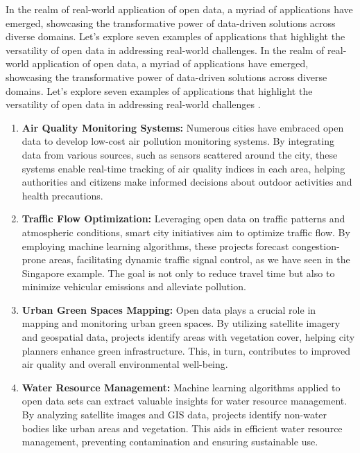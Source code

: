 In the realm of real-world application of open data, a myriad of applications have emerged, showcasing the transformative power of data-driven solutions across diverse domains. Let's explore seven examples of applications that highlight the versatility of open data in addressing real-world challenges.
In the realm of real-world application of open data, a myriad of applications have emerged, showcasing the transformative power of data-driven solutions across diverse domains. Let's explore seven examples of applications that highlight the versatility of open data in addressing real-world challenges \cite{electronics10232997}.
\begin{enumerate}
\item \textbf{Air Quality Monitoring Systems:}
   Numerous cities have embraced open data to develop low-cost air pollution monitoring systems. By integrating data from various sources, such as sensors scattered around the city, these systems enable real-time tracking of air quality indices in each area, helping authorities and citizens make informed decisions about outdoor activities and health precautions.

\item \textbf{Traffic Flow Optimization:}
   Leveraging open data on traffic patterns and atmospheric conditions, smart city initiatives aim to optimize traffic flow. By employing machine learning algorithms, these projects forecast congestion-prone areas, facilitating dynamic traffic signal control, as we have seen in the Singapore example. The goal is not only to reduce travel time but also to minimize vehicular emissions and alleviate pollution.

\item \textbf{Urban Green Spaces Mapping:}
   Open data plays a crucial role in mapping and monitoring urban green spaces. By utilizing satellite imagery and geospatial data, projects identify areas with vegetation cover, helping city planners enhance green infrastructure. This, in turn, contributes to improved air quality and overall environmental well-being.

\item \textbf{Water Resource Management:}
   Machine learning algorithms applied to open data sets can extract valuable insights for water resource management. By analyzing satellite images and GIS data, projects identify non-water bodies like urban areas and vegetation. This aids in efficient water resource management, preventing contamination and ensuring sustainable use.


\end{enumerate}
